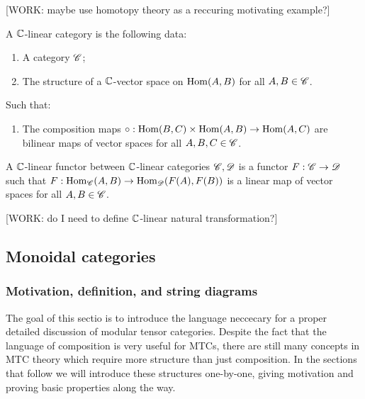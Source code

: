 [WORK: maybe use homotopy theory as a reccuring motivating example?]

\begin{definition} A $\mathbb{C}$-linear category is the following data:

\begin{enumerate}
\item A category $\mathscr{C}$;
\item The structure of a $\mathbb{C}$-vector space on $\operatorname{Hom}(A,B)$ for all $A,B\in \mathscr{C}$.

\end{enumerate}

Such that:

\begin{enumerate}

\item The composition maps $\circ:\operatorname{Hom}(B,C)\times \operatorname{Hom}(A,B)\to \operatorname{Hom}(A,C)$ are bilinear maps of vector spaces for all $A,B,C\in \mathscr{C}$.
\end{enumerate}

\raggedleft\qedsymbol{}
\end{definition}



\begin{definition} A $\mathbb{C}$-linear functor between $\mathbb{C}$-linear categories $\mathscr{C},\mathscr{D}$ is a functor $F:\mathscr{C}\to\mathscr{D}$ such that $F:\operatorname{Hom}_{\mathscr{C}}(A,B)\to\operatorname{Hom}_{\mathscr{D}}(F(A),F(B))$ is a linear map of vector spaces for all $A,B\in\mathscr{C}$.

\raggedleft\qedsymbol{}
\end{definition}


[WORK: do I need to define $\mathbb{C}$-linear natural transformation?]

\subsection{Monoidal categories}

\subsubsection{Motivation, definition, and string diagrams}

The goal of this sectio is to introduce the language neccecary for a proper detailed discussion of modular tensor categories. Despite the fact that the language of composition is very useful for MTCs, there are still many concepts in MTC theory which require more structure than just composition. In the sections that follow we will introduce these structures one-by-one, giving motivation and proving basic properties along the way.

